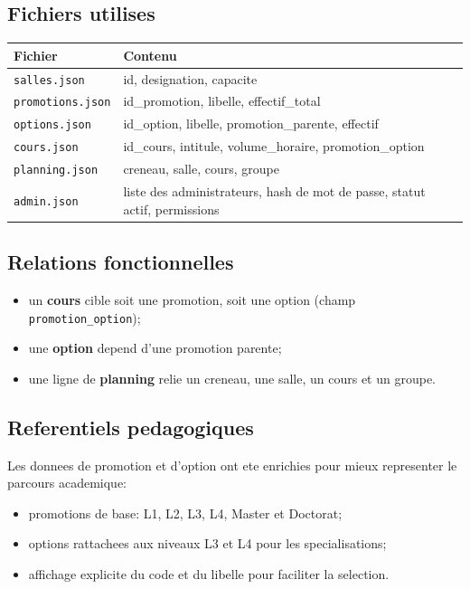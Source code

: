 \documentclass[12pt,a4paper]{article}
\begin{document}
\subsection{Fichiers utilises}
\begin{longtable}{|>{\raggedright\arraybackslash}p{3.2cm}|>{\raggedright\arraybackslash}p{9.2cm}|}
\hline
\textbf{Fichier} & \textbf{Contenu} \\\hline
\texttt{salles.json} & id, designation, capacite \\\hline
\texttt{promotions.json} & id\_promotion, libelle, effectif\_total \\\hline
\texttt{options.json} & id\_option, libelle, promotion\_parente, effectif \\\hline
\texttt{cours.json} & id\_cours, intitule, volume\_horaire, promotion\_option \\\hline
\texttt{planning.json} & creneau, salle, cours, groupe \\\hline
\texttt{admin.json} & liste des administrateurs, hash de mot de passe, statut actif, permissions \\\hline
\end{longtable}

\subsection{Relations fonctionnelles}
\begin{itemize}[leftmargin=1.2cm]
    \item un \textbf{cours} cible soit une promotion, soit une option (champ \texttt{promotion\_option});
    \item une \textbf{option} depend d'une promotion parente;
    \item une ligne de \textbf{planning} relie un creneau, une salle, un cours et un groupe.
\end{itemize}

\subsection{Referentiels pedagogiques}
Les donnees de promotion et d'option ont ete enrichies pour mieux representer le parcours academique:
\begin{itemize}[leftmargin=1.2cm]
    \item promotions de base: L1, L2, L3, L4, Master et Doctorat;
    \item options rattachees aux niveaux L3 et L4 pour les specialisations;
    \item affichage explicite du code et du libelle pour faciliter la selection.
\end{itemize}
\end{document}
